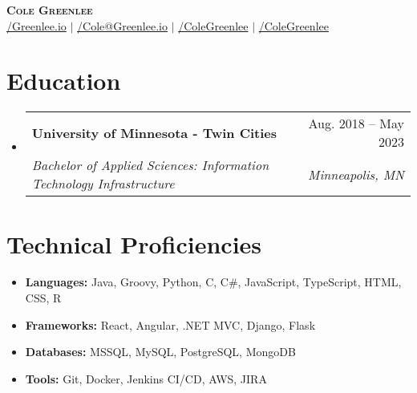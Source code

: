 \documentclass[letterpaper,11pt]{article}
\makeatletter
\newcommand{\techSkillItem}[2]{\item{\small{\textbf{#1: }{#2}}}\vspace{-5pt}}
\newcommand{\techSkillList}[1]{\begin{itemize}[leftmargin=0.15in]#1\end{itemize}\vspace{-10pt}}
\newcommand{\resumeSection}[2]{\section{#1}\begin{itemize}[leftmargin=0.15in, label={}]#2\end{itemize}}
\newcommand{\resumeItemHeading}[4]{\vspace{-2pt}\item{\begin{tabular*}{0.97\textwidth}[t]{l@{\extracolsep{\fill}}r}\textbf{#1} & #2\\\textit{\small#3} & \textit{\small #4}\\\end{tabular*}\vspace{-7pt}}}
\makeatother
\begin{document}
\begin{center}
	\begin{small}
		\textbf{\Huge \scshape Cole Greenlee} \\ \vspace{5pt}
		\href{https://Greenlee.io/}{\faGlobe/Greenlee.io}  $|$
		\href{mailto:Cole@Greenlee.io}{\faEnvelope[regular]/Cole@Greenlee.io} $|$
		\href{https://LinkedIn.com/in/ColeGreenlee}{\faLinkedin/ColeGreenlee} $|$
		\href{https://GitHub.com/ColeGreenlee}{\faGithub/ColeGreenlee}
	\end{small}
\end{center}

\resumeSection{Education}{
	\resumeItemHeading{University of Minnesota - Twin Cities}{Aug. 2018 -- May 2023}{Bachelor of Applied Sciences: Information Technology Infrastructure}{Minneapolis, MN}
}

\section{Technical Proficiencies}
\techSkillList{
	\techSkillItem{Languages}{Java, Groovy, Python, C, C\#, JavaScript, TypeScript, HTML, CSS, R}
	\techSkillItem{Frameworks}{ React, Angular, .NET MVC, Django, Flask}
	\techSkillItem{Databases}{MSSQL, MySQL, PostgreSQL, MongoDB}
	\techSkillItem{Tools}{Git, Docker, Jenkins CI/CD, AWS, JIRA}
}
\end{document}
